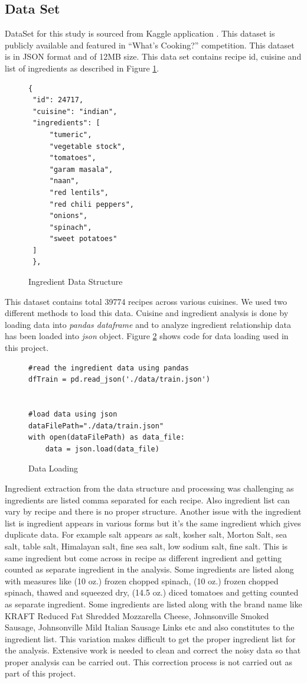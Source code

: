 \documentclass[sigconf]{acmart}
\begin{document}
\subsection{Data Set}
DataSet for this study is sourced from Kaggle application \cite{www-kaggle}. This dataset is publicly available and featured in ``What's Cooking?'' competition. This dataset is in JSON format and of 12MB size. This data set contains recipe id, cuisine and list of ingredients as described in Figure \ref{c:data-structure}.
\begin{figure}[htb]
\begin{verbatim}
{
 "id": 24717,
 "cuisine": "indian",
 "ingredients": [
     "tumeric",
     "vegetable stock",
     "tomatoes",
     "garam masala",
     "naan",
     "red lentils",
     "red chili peppers",
     "onions",
     "spinach",
     "sweet potatoes"
 ]
 },
\end{verbatim}
\caption{Ingredient Data Structure}\label{c:data-structure}
\end{figure}
This dataset contains total 39774 recipes across various cuisines. We used two different methods to load this data. Cuisine and ingredient analysis is done by loading data into \emph{pandas dataframe} and to analyze ingredient relationship data has been loaded into \emph{json} object. Figure \ref{c:data-loading} shows code for data loading used in this project.
\begin{figure}[htb]
\begin{verbatim}
#read the ingredient data using pandas
dfTrain = pd.read_json('./data/train.json')


#load data using json
dataFilePath="./data/train.json"
with open(dataFilePath) as data_file:    
    data = json.load(data_file)
\end{verbatim}
\caption{Data Loading}\label{c:data-loading}
\end{figure}

Ingredient extraction from the data structure and processing was challenging as ingredients are listed comma separated for each recipe. Also ingredient list can vary by recipe and there is no proper structure. Another issue with the ingredient list is ingredient appears in various forms but it's the same ingredient which gives duplicate data. For example salt appears as salt, kosher salt, Morton Salt, sea salt, table salt, Himalayan salt, fine sea salt, low sodium salt, fine salt. This is same ingredient but come across in recipe as different ingredient and getting counted as separate ingredient in the analysis. Some ingredients are listed along with measures like (10 oz.) frozen chopped spinach, (10 oz.) frozen chopped spinach, thawed and squeezed dry, (14.5 oz.) diced tomatoes and getting counted as separate ingredient. Some ingredients are listed along with the brand name like KRAFT Reduced Fat Shredded Mozzarella Cheese, Johnsonville Smoked Sausage, Johnsonville Mild Italian Sausage Links etc and also constitutes to the ingredient list. This variation makes difficult to get the proper ingredient list for the analysis. Extensive work is needed to clean and correct the noisy data so that proper analysis can be carried out. This correction process is not carried out as part of this project.
\end{document}
